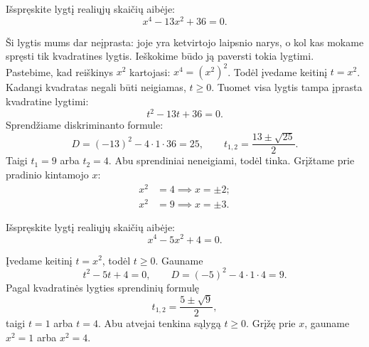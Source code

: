\documentclass[11pt,a4paper]{scrartcl}
\begin{document}
\begin{example}
Išspręskite lygtį realiųjų skaičių aibėje:
\begin{equation*}
x^4-13x^2+36=0.
\end{equation*}
\end{example}
\begin{solution}
Ši lygtis mums dar neįprasta: joje yra ketvirtojo laipsnio narys, o kol kas mokame spręsti tik kvadratines lygtis. Ieškokime būdo ją paversti tokia lygtimi. Pastebime, kad reiškinys \(x^2\) kartojasi: \(x^4=(x^2)^2\). Todėl įvedame keitinį \(t=x^2\). Kadangi kvadratas negali būti neigiamas, \(t\ge0\). Tuomet visa lygtis tampa įprasta kvadratine lygtimi:
\begin{equation*}
t^2-13t+36=0.
\end{equation*}
Sprendžiame diskriminanto formule:
\begin{equation*}
D=(-13)^2-4\cdot1\cdot36=25,\qquad
t_{1,2}=\frac{13\pm\sqrt{25}}{2}.
\end{equation*}
Taigi \(t_1=9\) arba \(t_2=4\). Abu sprendiniai neneigiami, todėl tinka. Grįžtame prie pradinio kintamojo \(x\):
\begin{equation*}
\begin{aligned}
x^2&=4 \implies x= \pm2;\\
x^2&=9 \implies x= \pm3.
\end{aligned}
\end{equation*}
\end{solution}

\begin{example}
Išspręskite lygtį realiųjų skaičių aibėje:
\begin{equation*}
x^4-5x^2+4=0.
\end{equation*}
\end{example}
\begin{solution}
Įvedame keitinį \(t=x^2\), todėl \(t\ge0\). Gauname
\begin{equation*}
t^2-5t+4=0,\qquad D=(-5)^2-4\cdot1\cdot4=9.
\end{equation*}
Pagal kvadratinės lygties sprendinių formulę
\begin{equation*}
t_{1,2}=\frac{5\pm\sqrt9}{2},
\end{equation*}
taigi \(t=1\) arba \(t=4\). Abu atvejai tenkina sąlygą \(t\ge0\). Grįžę prie \(x\), gauname \(x^2=1\) arba \(x^2=4\).
\end{solution}
\end{document}
